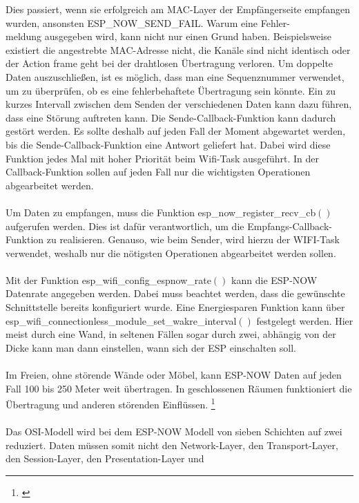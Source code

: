 \documentclass[titlepage,12pt,twoside]{article}
\begin{document}
Dies passiert, wenn sie erfolgreich am MAC-Layer der Empfängerseite empfangen wurden, ansonsten 
ESP\_NOW\_SEND\_FAIL. Warum eine Fehler-\\meldung ausgegeben wird, kann nicht 
nur einen Grund haben. Beispielsweise existiert die angestrebte MAC-Adresse 
nicht, die Kanäle sind nicht identisch oder der Action frame geht bei der 
drahtlosen Übertragung verloren. Um doppelte Daten auszuschließen, ist es 
möglich, dass man eine Sequenznummer verwendet, um zu überprüfen, ob es eine 
fehlerbehaftete Übertragung sein könnte. Ein zu kurzes Intervall zwischen 
dem Senden der verschiedenen Daten kann dazu führen, dass eine Störung 
auftreten kann. Die Sende-Callback-Funktion kann dadurch gestört werden. Es 
sollte deshalb auf jeden Fall der Moment abgewartet werden, bis die Sende-Callback-Funktion 
eine Antwort geliefert hat. Dabei wird diese Funktion jedes Mal mit hoher 
Priorität beim Wifi-Task ausgeführt. In der Callback-Funktion sollen auf 
jeden Fall nur die wichtigsten Operationen abgearbeitet werden. \\
\\
Um Daten zu empfangen, muss die Funktion esp\_now\_register\_recv\_cb$()$ aufgerufen 
werden. Dies ist dafür verantwortlich, um die Empfangs-Callback-Funktion zu 
realisieren. Genauso, wie beim Sender, wird hierzu der WIFI-Task verwendet, 
weshalb nur die nötigsten Operationen abgearbeitet werden sollen. \\
\\
Mit der Funktion esp\_wifi\_config\_espnow\_rate$()$ kann die ESP-NOW Datenrate angegeben 
werden. Dabei muss beachtet werden, dass die gewünschte Schnittstelle bereits 
konfiguriert wurde. Eine Energiesparen Funktion kann über 
esp\_wifi\_connectionless\_module\_set\_wakre\_interval$()$ festgelegt werden. Hier 
meist durch eine Wand, in seltenen Fällen sogar durch zwei, abhängig von der Dicke 
kann man dann einstellen, wann sich der ESP einschalten soll. \\
\\
\hfill \break
\hfill \break
\hfill \break
Im Freien, ohne störende Wände oder Möbel, kann ESP-NOW Daten auf jeden Fall 100 
bis 250 Meter weit übertragen. In geschlossenen Räumen funktioniert die Übertragung 
und anderen störenden Einflüssen. \footnote{\cite{wolles}} \\
\\
Das OSI-Modell wird bei dem ESP-NOW Modell von sieben Schichten auf 
zwei reduziert. Daten müssen somit nicht den Network-Layer, den 
Transport-Layer, den Session-Layer, den Presentation-Layer und 
\end{document}
